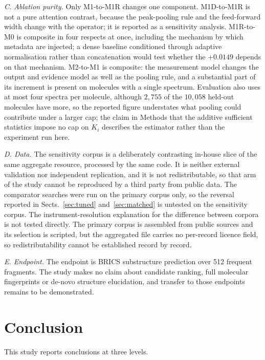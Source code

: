 \documentclass[11pt]{article}
\begin{document}
\emph{C. Ablation purity.} Only M1-to-M1R changes one component. M1D-to-M1R is not a
pure attention contrast, because the peak-pooling rule and the feed-forward width
change with the operator; it is reported as a sensitivity analysis. M1R-to-M0 is
composite in four respects at once, including the mechanism by which metadata are
injected; a dense baseline conditioned through adaptive normalisation rather than
concatenation would test whether the $+0.0149$ depends on that mechanism. M2-to-M1 is
composite: the measurement model changes the output and evidence model as well as the
pooling rule, and a substantial part of its increment is present on molecules with a
single spectrum. Evaluation also uses at most four spectra per molecule, although
$2{,}755$ of the $10{,}058$ held-out molecules have more, so the reported figure
understates what pooling could contribute under a larger cap; the claim in Methods
that the additive sufficient statistics impose no cap on $K_i$ describes the
estimator rather than the experiment run here.

\emph{D. Data.} The sensitivity corpus is a deliberately contrasting in-house slice
of the same aggregate resource, processed by the same code. It is neither external
validation nor independent replication, and it is not redistributable, so that arm of
the study cannot be reproduced by a third party from public data. The comparator
searches were run on the primary corpus only, so the reversal reported in
Sects.~\ref{sec:tuned} and~\ref{sec:matched} is untested on the sensitivity corpus.
The instrument-resolution explanation for the difference between corpora is not
tested directly. The primary corpus is assembled from public sources and its
selection is scripted, but the aggregated file carries no per-record licence field,
so redistributability cannot be established record by record.

\emph{E. Endpoint.} The endpoint is BRICS substructure prediction over 512 frequent
fragments. The study makes no claim about candidate ranking, full molecular
fingerprints or de-novo structure elucidation, and transfer to those endpoints
remains to be demonstrated.

\section*{Conclusion}

This study reports conclusions at three levels.
\end{document}
